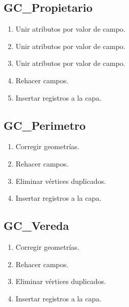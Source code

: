 \documentclass[letterpaper,10pt,spanish]{sphinxmanual}
\begin{document}
\subsection{GC\_Propietario}
\label{\detokenize{ETL_Cobol/Model:gc-propietario}}\begin{enumerate}
%
\item {} 
Unir atributos por valor de campo.

\item {} 
Unir atributos por valor de campo.

\item {} 
Unir atributos por valor de campo.

\item {} 
Rehacer campos.

\item {} 
Insertar registros a la capa.


\end{enumerate}


\subsection{GC\_Perimetro}
\label{\detokenize{ETL_Cobol/Model:gc-perimetro}}\begin{enumerate}
%
\item {} 
Corregir geometrías.

\item {} 
Rehacer campos.

\item {} 
Eliminar vértices duplicados.

\item {} 
Insertar registros a la capa.


\end{enumerate}


\subsection{GC\_Vereda}
\label{\detokenize{ETL_Cobol/Model:gc-vereda}}\begin{enumerate}
%
\item {} 
Corregir geometrías.

\item {} 
Rehacer campos.

\item {} 
Eliminar vértices duplicados.

\item {} 
Insertar registros a la capa.


\end{enumerate}
\end{document}
